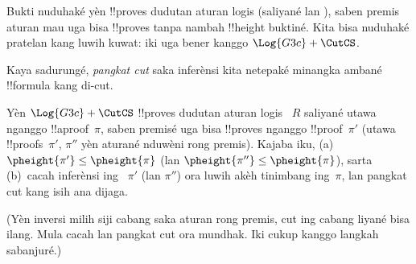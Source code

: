 \documentclass[../../../include/open-logic-section]{subfiles}
\begin{document}


Bukti  nuduhaké yèn
 !!{prove}s dudutan aturan logis
(saliyané \RightR{\lexists} lan \LeftR{\lforall}),
saben premis aturan mau uga bisa !!{prove}s tanpa nambah
!!{height} buktiné. Kita bisa nuduhaké pratelan kang luwih
kuwat: iki uga bener kanggo $\Log{G3c} + \CutCS$.

Kaya sadurungé, \emph{pangkat cut} saka inferènsi
\CutCS{} kita netepaké minangka ambané !!{formula}
kang di-cut.

\begin{lem}
Yèn $\Log{G3c} + \CutCS$ !!{prove}s dudutan aturan logis
~$R$ saliyané \RightR{\lexists} utawa \LeftR{\lforall}
nganggo !!a{proof}~$\pi$, saben premisé uga bisa
!!{prove}s nganggo !!{proof}~$\pi'$
(utawa !!{proof}s~$\pi'$, $\pi''$ yèn aturané
nduwèni rong premis). Kajaba iku,
(a)~$\pheight{\pi'}\le\pheight{\pi}$
(lan $\pheight{\pi''}\le\pheight{\pi}$), sarta
(b)~cacah inferènsi \CutCS{} ing
~$\pi'$ (lan $\pi''$) ora luwih akèh tinimbang ing~$\pi$,
lan pangkat cut kang isih ana dijaga.
\end{lem}
(Yèn inversi milih siji cabang saka aturan rong premis, cut ing cabang liyané bisa ilang. Mula cacah lan pangkat cut ora mundhak. Iki cukup kanggo langkah sabanjuré.)
\end{document}
